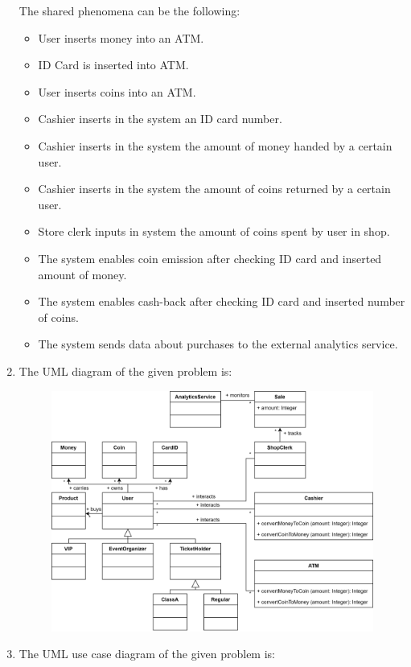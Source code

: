 \begin{enumerate}
        The shared phenomena can be the following: 
        \begin{itemize}
            \item User inserts money into an ATM.
            \item ID Card is inserted into ATM.
            \item User inserts coins into an ATM.
            \item Cashier inserts in the system an ID card number.
            \item Cashier inserts in the system the amount of money handed by a certain user.
            \item Cashier inserts in the system the amount of coins returned by a certain user.
            \item Store clerk inputs in system the amount of coins spent by user in shop.
            \item The system enables coin emission after checking ID card and inserted amount of money.
            \item The system enables cash-back after checking ID card and inserted number of coins.
            \item The system sends data about purchases to the external analytics service.
        \end{itemize}
    \item The UML diagram of the given problem is: 
        \begin{figure}[H]
            \centering
            \includegraphics[width=0.9\linewidth]{images/UML.png}
        \end{figure}
    \item The UML use case diagram of the given problem is: 

\end{enumerate}
